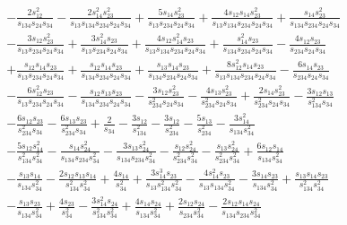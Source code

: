 \begin{align}
        & - \frac{2s_{12}^2}{s_{134}s_{24}s_{34}} - \frac{2s_{14}^2s_{23}^2}{s_{13}s_{134}s_{234}s_{24}s_{34}} + \frac{5s_{14}s_{23}^2}{s_{13}s_{234}s_{24}s_{34}} + \frac{4s_{12}s_{14}s_{23}^2}{s_{13}s_{134}s_{234}s_{24}s_{34}} + \frac{s_{14}s_{23}^2}{s_{134}s_{234}s_{24}s_{34}} \nonumber \\
        & - \frac{3s_{12}s_{23}^2}{s_{13}s_{234}s_{24}s_{34}} + \frac{3s_{14}^2s_{23}}{s_{13}s_{234}s_{24}s_{34}} + \frac{4s_{12}s_{14}^2s_{23}}{s_{13}s_{134}s_{234}s_{24}s_{34}} + \frac{s_{14}^2s_{23}}{s_{134}s_{234}s_{24}s_{34}} - \frac{4s_{12}s_{23}}{s_{234}s_{24}s_{34}} \nonumber \\
        & + \frac{s_{12}s_{14}s_{23}}{s_{13}s_{234}s_{24}s_{34}} + \frac{s_{12}s_{14}s_{23}}{s_{134}s_{234}s_{24}s_{34}} + \frac{s_{13}s_{14}s_{23}}{s_{134}s_{234}s_{24}s_{34}} + \frac{8s_{12}^2s_{14}s_{23}}{s_{13}s_{134}s_{234}s_{24}s_{34}} - \frac{6s_{14}s_{23}}{s_{234}s_{24}s_{34}} \nonumber \\
        & - \frac{6s_{12}^2s_{23}}{s_{13}s_{234}s_{24}s_{34}} - \frac{s_{12}s_{13}s_{23}}{s_{134}s_{234}s_{24}s_{34}} - \frac{3s_{12}s_{23}^2}{s_{234}^2s_{24}s_{34}} - \frac{4s_{13}s_{23}^2}{s_{234}^2s_{24}s_{34}} + \frac{2s_{14}s_{23}^2}{s_{234}^2s_{24}s_{34}} - \frac{3s_{12}s_{13}}{s_{134}^2s_{34}} \nonumber \\
        & - \frac{6s_{12}s_{23}}{s_{234}^2s_{34}} - \frac{6s_{13}s_{23}}{s_{234}^2s_{34}} + \frac{2}{s_{34}} - \frac{3s_{12}}{s_{134}^2} - \frac{3s_{12}}{s_{234}^2} - \frac{5s_{13}}{s_{234}^2} - \frac{3s_{14}^2}{s_{134}s_{34}^2} \nonumber \\
        & - \frac{5s_{12}s_{14}^2}{s_{134}^2s_{34}^2} - \frac{s_{14}s_{24}^2}{s_{134}s_{234}s_{34}^2} - \frac{3s_{13}s_{24}^2}{s_{134}s_{234}s_{34}^2} - \frac{s_{12}s_{24}^2}{s_{234}^2s_{34}^2} - \frac{s_{13}s_{24}^2}{s_{234}^2s_{34}^2} + \frac{6s_{12}s_{14}}{s_{134}s_{34}^2} \nonumber \\
        & - \frac{s_{13}s_{14}}{s_{134}s_{34}^2} - \frac{2s_{12}s_{13}s_{14}}{s_{134}^2s_{34}^2} + \frac{4s_{14}}{s_{34}^2} + \frac{3s_{14}^3s_{23}}{s_{13}s_{134}^2s_{34}^2} - \frac{4s_{14}^2s_{23}}{s_{13}s_{134}s_{34}^2} - \frac{3s_{14}s_{23}}{s_{134}s_{34}^2} + \frac{s_{13}s_{14}s_{23}}{s_{134}^2s_{34}^2} \nonumber \\
        & - \frac{s_{13}s_{23}}{s_{134}s_{34}^2} + \frac{4s_{23}}{s_{34}^2} - \frac{3s_{14}^2s_{24}}{s_{134}^2s_{34}^2} + \frac{4s_{14}s_{24}}{s_{134}s_{34}^2} + \frac{2s_{12}s_{24}}{s_{234}s_{34}^2} - \frac{2s_{12}s_{14}s_{24}}{s_{134}s_{234}s_{34}^2} \nonumber \\

\end{align}

